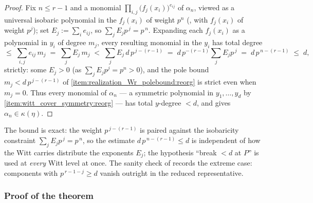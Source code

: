 \begin{proof}
    Fix $n \leq r-1$ and a monomial $\prod_{i,j} \bigl(f_j(x_i)\bigr)^{e_{ij}}$ of
    $\alpha_n$, viewed as a universal isobaric polynomial in the $f_j(x_i)$ of
    weight $p^n$ (, with $f_j(x_i)$ of weight
    $p^j$); set $E_j := \sum_i e_{ij}$, so $\sum_j E_j p^{\,j} = p^{\,n}$. Expanding
    each $f_j(x_i)$ as a polynomial in $y_i$ of degree $m_j$, every resulting
    monomial in the $y_i$ has total degree
    \[
    \leq\; \sum_{i,j} e_{ij}\, m_j \;=\; \sum_j E_j\, m_j
    \;<\; \sum_j E_j\, d\, p^{\,j-(r-1)}
    \;=\; d\, p^{-(r-1)} \sum_j E_j p^{\,j}
    \;=\; d\, p^{\,n-(r-1)} \;\leq\; d,
    \]
    strictly: some $E_j > 0$ (as $\sum_j E_j p^j = p^n > 0$), and the pole bound
    $m_j < d\, p^{\,j-(r-1)}$ of
    \ref{item:realization_Wr_polebound:reorg} is strict
    even when $m_j = 0$. Thus every monomial of $\alpha_n$ --- a symmetric polynomial
    in $y_1, \dots, y_d$ by
    \ref{item:witt_cover_symmetry:reorg} --- has total
    $y$-degree $< d$, and  gives
    $\alpha_n \in \kappa(\eta)$.
\end{proof}

\begin{rem*}
    The bound is exact: the weight $p^{\,j-(r-1)}$ is paired against the isobaricity
    constraint $\sum_j E_j p^{\,j} = p^{\,n}$, so the estimate
    $d\, p^{\,n-(r-1)} \leq d$ is independent of how the Witt carries distribute the
    exponents $E_j$; the hypothesis ``break $< d$ at $P$'' is used at \emph{every}
    Witt level at once. The sanity check of
     records the extreme case: components with
    $p^{\,r-1-j} \geq d$ vanish outright in the reduced representative.
\end{rem*}

\subsubsection*{Proof of the theorem}

